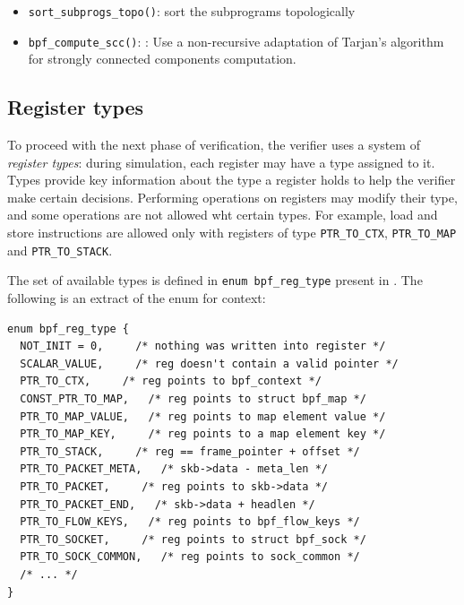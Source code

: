 \begin{itemize}
    \item \verb|sort_subprogs_topo()|: sort the subprograms topologically

    \item \verb|bpf_compute_scc()|: : Use a non-recursive adaptation of Tarjan's
      algorithm for strongly connected components computation.





\end{itemize}

\subsection{Register types}

To proceed with the next phase of verification, the verifier uses a system of
\textit{register types}: during simulation, each register may have a type
assigned to it. Types provide key information about the type a register holds to
help the verifier make certain decisions. Performing operations on registers may
modify their type, and some operations are not allowed wht certain types. For
example, load and store instructions are allowed only with registers of type
\verb|PTR_TO_CTX|, \verb|PTR_TO_MAP| and \verb|PTR_TO_STACK|.

The set of available types is defined in \verb|enum bpf_reg_type| present in
. The following is an extract of the enum
for context:

\begin{verbatim}
enum bpf_reg_type {
  NOT_INIT = 0,     /* nothing was written into register */
  SCALAR_VALUE,     /* reg doesn't contain a valid pointer */
  PTR_TO_CTX,     /* reg points to bpf_context */
  CONST_PTR_TO_MAP,   /* reg points to struct bpf_map */
  PTR_TO_MAP_VALUE,   /* reg points to map element value */
  PTR_TO_MAP_KEY,     /* reg points to a map element key */
  PTR_TO_STACK,     /* reg == frame_pointer + offset */
  PTR_TO_PACKET_META,   /* skb->data - meta_len */
  PTR_TO_PACKET,     /* reg points to skb->data */
  PTR_TO_PACKET_END,   /* skb->data + headlen */
  PTR_TO_FLOW_KEYS,   /* reg points to bpf_flow_keys */
  PTR_TO_SOCKET,     /* reg points to struct bpf_sock */
  PTR_TO_SOCK_COMMON,   /* reg points to sock_common */
  /* ... */
}
\end{verbatim}

